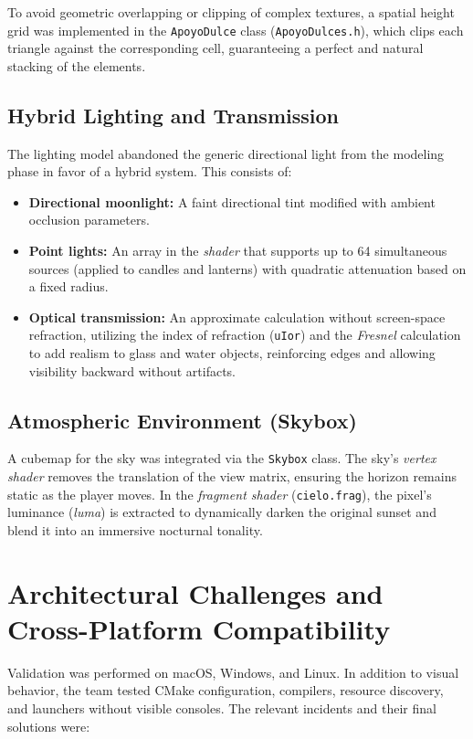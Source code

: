 \documentclass[letter,11pt]{article}
\begin{document}
	To avoid geometric overlapping or clipping of complex textures, a spatial height grid was implemented in the \texttt{ApoyoDulce} class (\texttt{ApoyoDulces.h}), which clips each triangle against the corresponding cell, guaranteeing a perfect and natural stacking of the elements.
	
	\subsection{Hybrid Lighting and Transmission}
	The lighting model abandoned the generic directional light from the modeling phase in favor of a hybrid system. This consists of:
	\begin{itemize}[leftmargin=*]
		\item \textbf{Directional moonlight:} A faint directional tint modified with ambient occlusion parameters.
		\item \textbf{Point lights:} An array in the \textit{shader} that supports up to 64 simultaneous sources (applied to candles and lanterns) with quadratic attenuation based on a fixed radius.
		\item \textbf{Optical transmission:} An approximate calculation without screen-space refraction, utilizing the index of refraction (\texttt{uIor}) and the \textit{Fresnel} calculation to add realism to glass and water objects, reinforcing edges and allowing visibility backward without artifacts.
	\end{itemize}
	
	\subsection{Atmospheric Environment (Skybox)}
	A cubemap for the sky was integrated via the \texttt{Skybox} class. The sky's \textit{vertex shader} removes the translation of the view matrix, ensuring the horizon remains static as the player moves. In the \textit{fragment shader} (\texttt{cielo.frag}), the pixel's luminance (\textit{luma}) is extracted to dynamically darken the original sunset and blend it into an immersive nocturnal tonality.
	
	\section{Architectural Challenges and Cross-Platform Compatibility}
	Validation was performed on macOS, Windows, and Linux. In addition to visual behavior, the team tested CMake configuration, compilers, resource discovery, and launchers without visible consoles. The relevant incidents and their final solutions were:
	
\end{document}

